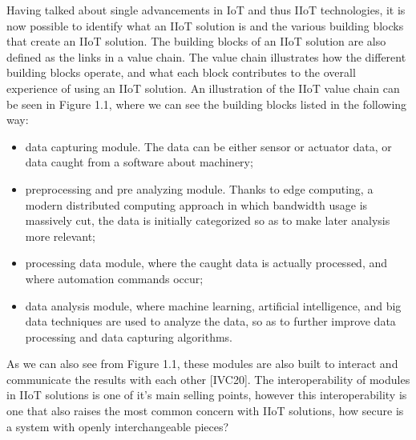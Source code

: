 \documentclass[a4paper, 12pt]{book}
\begin{document}
Having talked about single advancements in IoT and thus IIoT technologies, it is now possible to identify what an IIoT solution is and the various building blocks that create an IIoT solution. The building blocks of an IIoT solution are also defined as the links in a value chain. The value chain illustrates how the different building blocks operate, and what each block contributes to the overall experience of using an IIoT solution. An illustration of the IIoT value chain can be seen in Figure 1.1, where we can see the building blocks listed in the following way:

\begin{itemize}
    \item data capturing module. The data can be either sensor or actuator data, or data caught from a software about machinery;
    \item preprocessing and pre analyzing module. Thanks to edge computing, a modern distributed computing approach in which bandwidth usage is massively cut, the data is initially categorized so as to make later analysis more relevant;
    \item processing data module, where the caught data is actually processed, and where automation commands occur;
    \item data analysis module, where machine learning, artificial intelligence, and big data techniques are used to analyze the data, so as to further improve data processing and data capturing algorithms.
\end{itemize}

As we can also see from Figure 1.1, these modules are also built to interact and communicate the results with each other [IVC20]. The interoperability of modules in IIoT solutions is one of it’s main selling points, however this interoperability is one that also raises the most common concern with IIoT solutions, how secure is a system with openly interchangeable pieces?
\end{document}
